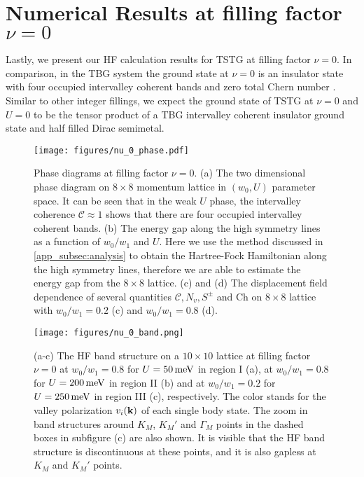 \documentclass[prb,aps,nofootinbib,amssymb,twocolumn,superscriptaddress,10pt]{revtex4-2}
\begin{document}
\section{Numerical Results at filling factor \texorpdfstring{$\nu=0$}{nu=0}}\label{sec:nu_0}
Lastly, we present our HF calculation results for TSTG at filling factor $\nu=0$. In comparison, in the TBG system the ground state at $\nu=0$ is an insulator state with four occupied intervalley coherent bands and zero total Chern number \cite{ZHA20,LIA20}. Similar to other integer fillings, we expect the ground state of TSTG at $\nu=0$ and $U=0$ to be the tensor product of a TBG intervalley coherent insulator ground state and half filled Dirac semimetal.

\begin{figure*}[!htbp]
	\centering
	\texttt{[image: figures/nu\_0\_phase.pdf]}
	\caption{Phase diagrams at filling factor $\nu=0$. (a) The two dimensional phase diagram on $8\times 8$ momentum lattice in $(w_0, U)$ parameter space. It can be seen that in the weak $U$ phase, the intervalley coherence $\mathcal{C} \approx 1$ shows that there are four occupied intervalley coherent bands. (b) The energy gap along the high symmetry lines as a function of $w_0/w_1$ and $U$. Here we use the method discussed in \ref{app_subsec:analysis} to obtain the Hartree-Fock Hamiltonian along the high symmetry lines, therefore we are able to estimate the energy gap from the $8\times 8$ lattice. (c) and (d) The displacement field dependence of several quantities $\mathcal{C}, N_v, S^{\pm}$ and $\mathrm{Ch}$ on $8\times 8$ lattice with $w_0/w_1 = 0.2$ (c) and $w_0/w_1 = 0.8$ (d).}
	\label{fig:phase_0}
\end{figure*}

\begin{figure*}
	\centering
	\texttt{[image: figures/nu\_0\_band.png]}
	\caption{(a-c) The HF band structure on a $10\times 10$ lattice at filling factor $\nu=0$ at $w_0/w_1 = 0.8$ for $U=50\,\rm meV$ in region I (a), at $w_0/w_1 = 0.8$ for $U=200\rm\,meV$ in region II (b) and at $w_0/w_1 = 0.2$ for $U=250\,\rm meV$ in region III (c), respectively.  The color stands for the valley polarization $v_i(\mathbf{k})$ of each single body state. The zoom in band structures around $K_M$, $K_M'$ and $\Gamma_M$ points in the dashed boxes in subfigure (c) are also shown. It is visible that the HF band structure is discontinuous at these points, and it is also gapless at $K_M$ and $K_M'$ points.}
	\label{fig:band_0}
\end{figure*}
\end{document}
